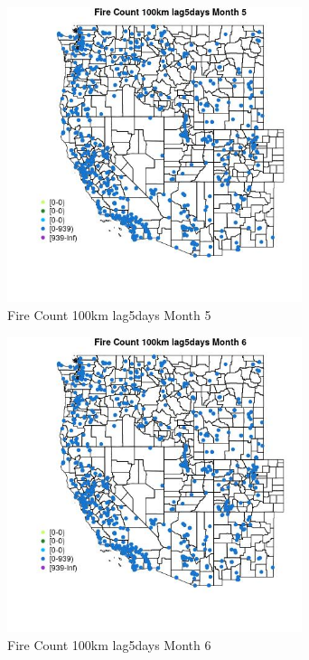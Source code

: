 \begin{figure} 
\centering  
\includegraphics[width=0.77\textwidth]{Code_Outputs/Report_ML_input_PM25_Step4_part_e_de_duplicated_aves_compiled_2019-05-21wNAs_MapObsMo5Fire_Count_100km_lag5days.jpg} 
\caption{\label{fig:Report_ML_input_PM25_Step4_part_e_de_duplicated_aves_compiled_2019-05-21wNAsMapObsMo5Fire_Count_100km_lag5days}Fire Count 100km lag5days Month 5} 
\end{figure} 
 

\begin{figure} 
\centering  
\includegraphics[width=0.77\textwidth]{Code_Outputs/Report_ML_input_PM25_Step4_part_e_de_duplicated_aves_compiled_2019-05-21wNAs_MapObsMo6Fire_Count_100km_lag5days.jpg} 
\caption{\label{fig:Report_ML_input_PM25_Step4_part_e_de_duplicated_aves_compiled_2019-05-21wNAsMapObsMo6Fire_Count_100km_lag5days}Fire Count 100km lag5days Month 6} 
\end{figure} 
 

